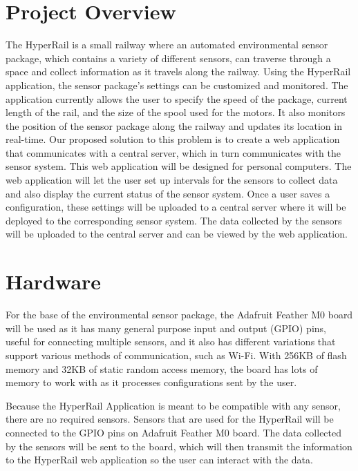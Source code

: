 \documentclass[onecolumn, draftclsnofoot,10pt, compsoc]{IEEEtran}
\begin{document}
\section{Project Overview}
The HyperRail is a small railway where an automated environmental sensor package, which contains a variety of different sensors, can traverse through a space and collect information as it travels along the railway. Using the HyperRail application, the sensor package's settings can be customized and monitored. The application currently allows the user to specify the speed of the package, current length of the rail, and the size of the spool used for the motors. It also monitors the position of the sensor package along the railway and updates its location in real-time. Our proposed solution to this problem is to create a web application that communicates with a central server, which in turn communicates with the sensor system. This web application will be designed for personal computers. The web application will let the user set up intervals for the sensors to collect data and also display the current status of the sensor system. Once a user saves a configuration, these settings will be uploaded to a central server where it will be deployed to the corresponding sensor system. The data collected by the sensors will be uploaded to the central server and can be viewed by the web application. 


\section{Hardware}
For the base of the environmental sensor package, the Adafruit Feather M0 board will be used as it has many general purpose input and output (GPIO) pins, useful for connecting multiple sensors, and it also has different variations that support various methods of communication, such as Wi-Fi. With 256KB of flash memory and 32KB of static random access memory, the board has lots of memory to work with as it processes configurations sent by the user.

Because the HyperRail Application is meant to be compatible with any sensor, there are no required sensors. Sensors that are used for the HyperRail will be connected to the GPIO pins on Adafruit Feather M0 board. The data collected by the sensors will be sent to the board, which will then transmit the information to the HyperRail web application so the user can interact with the data.
\end{document}
